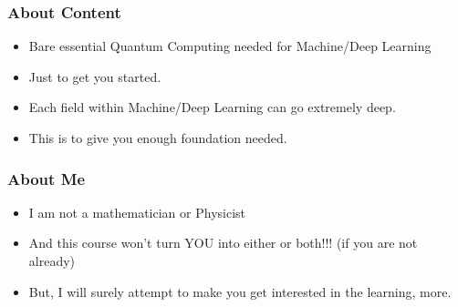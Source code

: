  \begin{frame}[fragile]\frametitle{About Content}
\begin{itemize}
\item Bare essential Quantum Computing needed for Machine/Deep Learning
\item Just to get you started.
\item Each field within Machine/Deep Learning can go extremely deep.
\item This is to give you enough foundation needed.
\end{itemize}
\end{frame}

 \begin{frame}[fragile]\frametitle{About Me}
\begin{itemize}
\item I am not a mathematician or Physicist
\item And this course won't turn YOU into either or both!!! (if you are not already)
\item But, I will surely attempt to make you get interested in the learning, more.
\end{itemize}
\end{frame}

